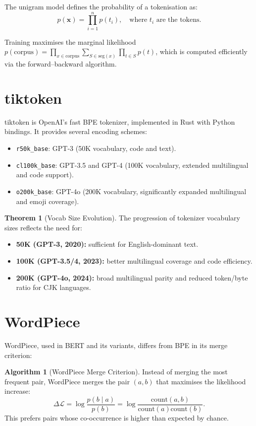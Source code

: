 \documentclass[11pt,a4paper]{book}
\theoremstyle{definition}
\newtheorem{theorem}{Theorem}[chapter]
\newtheorem{algorithm}{Algorithm}[chapter]
\begin{document}
The unigram model defines the probability of a tokenisation as:
\begin{equation}
	p(\mathbf{x}) = \prod_{i=1}^n p(t_i), \quad \text{where } t_i \text{ are the tokens}.
\end{equation}

Training maximises the marginal likelihood $p(\text{corpus}) = \prod_{x \in \text{corpus}} \sum_{S \in \text{seg}(x)} \prod_{t \in S} p(t)$, which is computed efficiently via the forward--backward algorithm.

\section{tiktoken}

tiktoken is OpenAI's fast BPE tokenizer, implemented in Rust with Python bindings. It provides several encoding schemes:

\begin{itemize}
	\item \texttt{r50k\_base}: GPT-3 (50K vocabulary, code and text).
	\item \texttt{cl100k\_base}: GPT-3.5 and GPT-4 (100K vocabulary, extended multilingual and code support).
	\item \texttt{o200k\_base}: GPT-4o (200K vocabulary, significantly expanded multilingual and emoji coverage).
\end{itemize}

\begin{theorem}[Vocab Size Evolution]
	The progression of tokenizer vocabulary sizes reflects the need for:
	\begin{itemize}
		\item \textbf{50K (GPT-3, 2020):} sufficient for English-dominant text.
		\item \textbf{100K (GPT-3.5/4, 2023):} better multilingual coverage and code efficiency.
		\item \textbf{200K (GPT-4o, 2024):} broad multilingual parity and reduced token/byte ratio for CJK languages.
	\end{itemize}
\end{theorem}

\section{WordPiece}

WordPiece, used in BERT and its variants, differs from BPE in its merge criterion:

\begin{algorithm}[WordPiece Merge Criterion]
	Instead of merging the most frequent pair, WordPiece merges the pair $(a, b)$ that maximises the likelihood increase:
	\begin{equation}
		\Delta \mathcal{L} = \log \frac{p(b \mid a)}{p(b)} = \log \frac{\text{count}(a,b)}{\text{count}(a)\text{count}(b)}.
	\end{equation}
	This prefers pairs whose co-occurrence is higher than expected by chance.
\end{algorithm}
\end{document}
